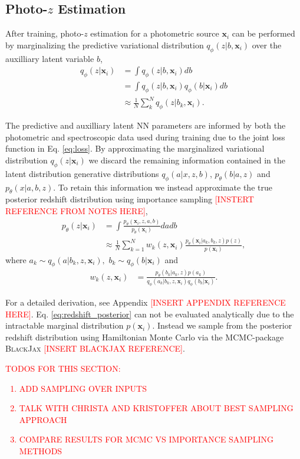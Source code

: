 \subsection{Photo-$z$ Estimation}

After training, photo-$z$ estimation for a photometric source $\mathbf{x}_i$ can be performed by marginalizing the predictive variational distribution $q_\phi(z|b,\mathbf{x}_i)$ over the auxilliary latent variable $b$,
\begin{align}
    q_\phi(z|\mathbf{x}_i) &= \int q_\phi(z|b, \mathbf{x}_i) db \\
    &= \int q_\phi(z|b,\mathbf{x}_i) q_\phi(b|\mathbf{x}_i) db \\
    &\approx \frac{1}{N} \sum_k^N q_\phi(z|b_k,\mathbf{x}_i). \label{eq:predictive_variational_dist}
\end{align}

The predictive and auxilliary latent NN parameters are informed by both the photometric and spectroscopic data used during training due to the joint loss function in Eq. \ref{eq:loss}. By approximating the marginalized variational distribution $q_\phi(z|\mathbf{x}_i)$ we discard the remaining information contained in the latent distribution generative distributions $q_\phi(a|x,z,b)$, $p_\theta(b|a,z)$ and $p_\theta(x|a,b,z)$. To retain this information we instead approximate the true posterior redshift distribution using importance sampling \textcolor{red}{[INSTERT REFERENCE FROM NOTES HERE]},
\begin{align}
    p_\theta(z|\mathbf{x}_i) &= \int \frac{p_\theta(\mathbf{x}_i, z, a, b)}{p_\theta(\mathbf{x}_i)}dadb \\
    &\approx \frac{1}{N} \sum_{k=1}^N w_k(z, \mathbf{x}_i)\frac{p_\theta(\mathbf{x}_i|a_k, b_k, z) p(z)}{p(\mathbf{x}_i)}, \label{eq:redshift_posterior}
\end{align}
where $a_k \sim q_\phi(a|b_k, z, \mathbf{x}_i),$ $ b_k \sim q_\phi(b|\mathbf{x}_i)$ and
\begin{align}
    w_k(z, \mathbf{x}_i) &= \frac{
        p_\theta(b_k| a_k, z) p(a_k) 
    }{
        q_\phi(a_k|b_k, z, \mathbf{x}_i) q_\phi(b_k|\mathbf{x}_i)
    }.
\end{align}

For a detailed derivation, see Appendix \textcolor{red}{[INSERT APPENDIX REFERENCE HERE]}. Eq. \ref{eq:redshift_posterior} can not be evaluated analytically due to the intractable marginal distribution $p(\mathbf{x}_i)$. Instead we sample from the posterior redshift distribution using Hamiltonian Monte Carlo via the MCMC-package \textsc{BlackJax} \textcolor{red}{[INSERT BLACKJAX REFERENCE]}.

\textcolor{red}{
TODOS FOR THIS SECTION:
\begin{enumerate}
    \item ADD SAMPLING OVER INPUTS
    \item TALK WITH CHRISTA AND KRISTOFFER ABOUT BEST SAMPLING APPROACH
    \item COMPARE RESULTS FOR MCMC VS IMPORTANCE SAMPLING METHODS
\end{enumerate}
}